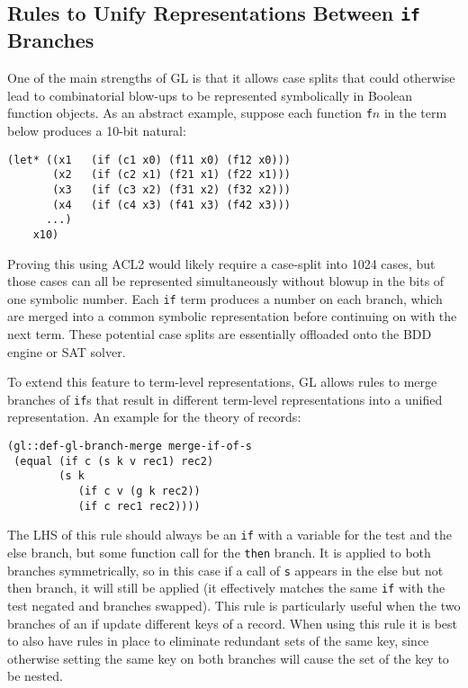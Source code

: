 \documentclass[submission,copyright,creativecommons]{eptcs}
\begin{document}
\subsection{Rules to Unify Representations Between \texttt{if} Branches}
\label{sec:branchmerge}

One of the main strengths of GL is that it allows case splits that
could otherwise lead to combinatorial blow-ups to be represented
symbolically in Boolean function objects.  As an abstract example,
suppose each function \texttt{f$n$} in the term below produces a
10-bit natural:
\begin{verbatim}
(let* ((x1   (if (c1 x0) (f11 x0) (f12 x0)))
       (x2   (if (c2 x1) (f21 x1) (f22 x1)))
       (x3   (if (c3 x2) (f31 x2) (f32 x2)))
       (x4   (if (c4 x3) (f41 x3) (f42 x3)))
      ...)
    x10)
\end{verbatim}
\noindent Proving this using ACL2 would likely require a case-split
into 1024 cases, but those cases can all be represented simultaneously
without blowup in the bits of one symbolic number.  Each \texttt{if}
term produces a number on each branch, which are merged into a common
symbolic representation before continuing on with the next term.
These potential case splits are essentially offloaded onto the BDD
engine or SAT solver.

To extend this feature to term-level representations, GL allows rules
to merge branches of \texttt{if}s that result in different term-level
representations into a unified representation. An
example for the theory of records:
\begin{verbatim}
(gl::def-gl-branch-merge merge-if-of-s
 (equal (if c (s k v rec1) rec2)
        (s k
           (if c v (g k rec2))
           (if c rec1 rec2))))  
\end{verbatim}
\noindent The LHS of this rule should always be an \texttt{if} with a
variable for the test and the else branch, but some function call for
the \texttt{then} branch.  It is applied to both branches
symmetrically, so in this case if a call of \texttt{s} appears in the
else but not then branch, it will still be applied (it effectively
matches the same \texttt{if} with the test negated and branches
swapped).
This rule is particularly useful when the two branches of an if update
different keys of a record.  When using this rule it is best to also
have rules in place to eliminate redundant sets of the same key, since
otherwise setting the same key on both branches will cause the set of
the key to be nested.
\end{document}
